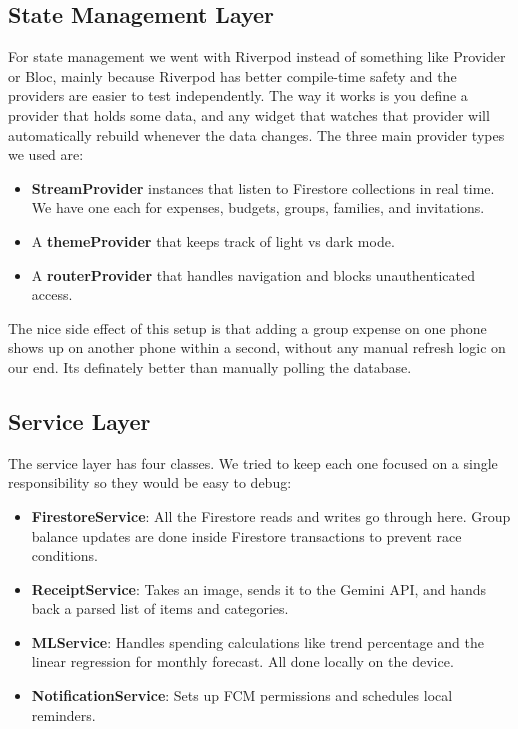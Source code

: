 \documentclass[conference]{IEEEtran}
\begin{document}
\subsection{State Management Layer}

For state management we went with Riverpod instead of something like Provider or Bloc, mainly because Riverpod has better compile-time safety and the providers are easier to test independently. The way it works is you define a provider that holds some data, and any widget that watches that provider will automatically rebuild whenever the data changes. The three main provider types we used are:

\begin{itemize}
  \item \textbf{StreamProvider} instances that listen to Firestore collections in real time. We have one each for expenses, budgets, groups, families, and invitations.
  \item A \textbf{themeProvider} that keeps track of light vs dark mode.
  \item A \textbf{routerProvider} that handles navigation and blocks unauthenticated access.
\end{itemize}

The nice side effect of this setup is that adding a group expense on one phone shows up on another phone within a second, without any manual refresh logic on our end. Its definately better than manually polling the database.

\subsection{Service Layer}

The service layer has four classes. We tried to keep each one focused on a single responsibility so they would be easy to debug:

\begin{itemize}
  \item \textbf{FirestoreService}: All the Firestore reads and writes go through here. Group balance updates are done inside Firestore transactions to prevent race conditions.
  \item \textbf{ReceiptService}: Takes an image, sends it to the Gemini API, and hands back a parsed list of items and categories.
  \item \textbf{MLService}: Handles spending calculations like trend percentage and the linear regression for monthly forecast. All done locally on the device.
  \item \textbf{NotificationService}: Sets up FCM permissions and schedules local reminders.
\end{itemize}
\end{document}
